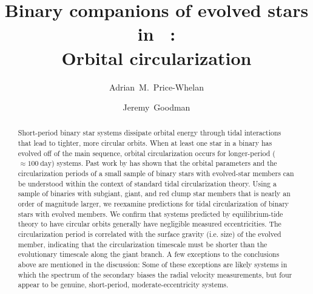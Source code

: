 \documentclass[modern, letterpaper]{aastex62}
\newcommand{\apogee}{\project{\acronym{APOGEE}}}
\newcommand{\DR}{\acronym{DR14}}
\begin{document}
\sloppy\sloppypar\raggedbottom\frenchspacing %

\title{Binary companions of evolved stars in \apogee\ \DR: \\
       Orbital circularization}

\author[0000-0003-0872-7098]{Adrian~M.~Price-Whelan}

\author[0000-0002-6710-7748]{Jeremy~Goodman}



\begin{abstract}\noindent %
Short-period binary star systems dissipate orbital energy through tidal
interactions that lead to tighter, more circular orbits.
When at least one star in a binary has evolved off of the main sequence, orbital
circularization occurs for longer-period ($\approx 100~\textrm{day}$) systems.
Past work by \citet{Verbunt:1995} has shown that the orbital parameters and the
circularization periods of a small sample of binary stars with evolved-star
members can be understood within the context of standard tidal circularization
theory.
Using a sample of binaries with subgiant, giant, and red clump star members that
is nearly an order of magnitude larger, we reexamine predictions for tidal
circularization of binary stars with evolved members.
We confirm that systems predicted by equilibrium-tide theory to have circular
orbits generally have negligible measured eccentricities.
The circularization period is correlated with the surface gravity (i.e. size) of
the evolved member, indicating that the circularization timescale must be
shorter than the evolutionary timescale along the giant branch.
A few exceptions to the conclusions above are mentioned in the discussion: Some
of these exceptions are likely systems in which the spectrum of the secondary
biases the radial velocity measurements, but four appear to be genuine,
short-period, moderate-eccentricity systems.

\end{abstract}
\end{document}
